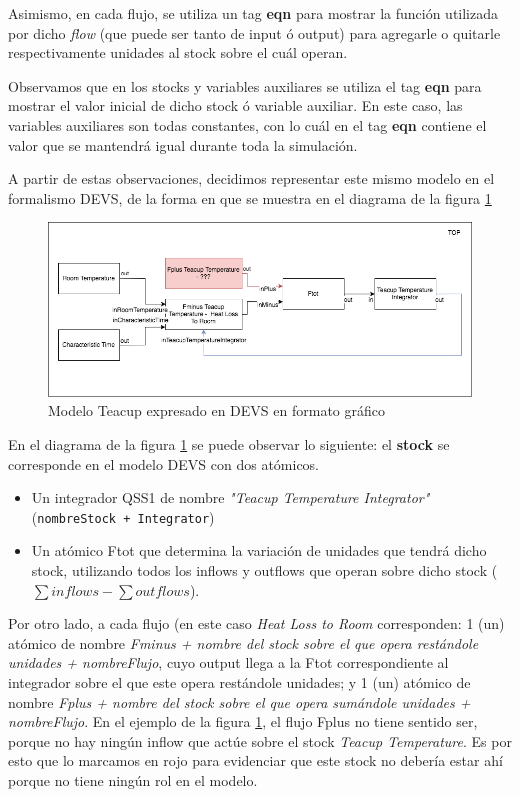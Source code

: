 Asimismo, en cada flujo, se utiliza un tag \textbf{eqn} para mostrar la función utilizada por dicho \textit{flow} (que puede ser tanto de input ó output) para agregarle o quitarle respectivamente unidades al stock sobre el cuál operan. 

Observamos que en los stocks y variables auxiliares se utiliza el tag \textbf{eqn} para mostrar el valor inicial de dicho stock ó variable auxiliar. En este caso, las variables auxiliares son todas constantes, con lo cuál en el tag \textbf{eqn} contiene el valor que se mantendrá igual durante toda la simulación.

A partir de estas observaciones, decidimos representar este mismo modelo en el formalismo DEVS, de la forma en que se muestra en el diagrama de la figura \ref{fig:Teacup_devs_flattened}

\begin{figure}[!h]
\centering
\includegraphics[scale=0.5]{imagenes/Teacup_devs_flattened}
\caption{Modelo Teacup expresado en DEVS en formato gráfico}
\label{fig:Teacup_devs_flattened}
\end{figure}

En el diagrama de la figura \ref{fig:Teacup_devs_flattened} se puede observar lo siguiente: el \textbf{stock} se corresponde en el modelo DEVS con dos atómicos.

\begin{itemize}
	\item Un integrador QSS1 de nombre \textit{"Teacup Temperature Integrator"} (\texttt{nombreStock + Integrator})
	\item Un atómico Ftot que determina la variación de unidades que tendrá dicho stock, utilizando todos los inflows y outflows que operan sobre dicho stock ($\sum inflows - \sum outflows $). 
\end{itemize}

Por otro lado, a cada flujo (en este caso \textit{Heat Loss to Room} corresponden: 1 (un) atómico de nombre \textit{Fminus + nombre del stock sobre el que opera restándole unidades + nombreFlujo}, cuyo output llega a la Ftot correspondiente al integrador sobre el que este opera restándole unidades; y 1 (un) atómico de nombre \textit{Fplus + nombre del stock sobre el que opera sumándole unidades + nombreFlujo}. En el ejemplo de la figura \ref{fig:Teacup_devs_flattened}, el flujo Fplus no tiene sentido ser, porque no hay ningún inflow que actúe sobre el stock \textit{Teacup Temperature}. Es por esto que lo marcamos en rojo para evidenciar que este stock no debería estar ahí porque no tiene ningún rol en el modelo. 

